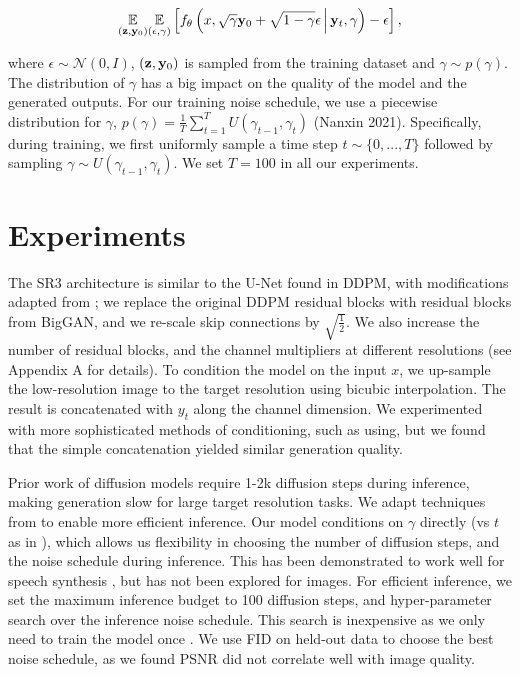 \documentclass{article}
\begin{document}
\begin{equation}
\underset{(\bold{z},\bold{y}_{0})}{\mathbb{E}}\underset{(\epsilon,\gamma)}{\mathbb{E}} \left[ f_{\theta}\left(x, \sqrt{\gamma} \bold{y}_0 + \sqrt{1 - \gamma} \epsilon \, \middle|\, \bold{y}_{t}, \gamma\right) - \epsilon \right],
\end{equation} 

where $\epsilon \sim \mathcal{N}(0, I)$, $(\bold{z},\bold{y}_{0})$ is sampled from the training dataset and $\gamma \sim p(\gamma)$. The distribution of $\gamma$ has a big impact on the quality of the model and the generated outputs. For our training noise schedule, we use a piecewise distribution for $\gamma$, $p(\gamma) = \frac{1}{T}\sum_{t=1}^{T} U(\gamma_{t-1}, \gamma_t)$ (Nanxin 2021). Specifically, during training, we first uniformly sample a time step $t \sim \{0, ..., T\}$ followed by sampling $\gamma \sim U(\gamma_{t-1}, \gamma_t)$. We set $T = 100$ in all our experiments.


\section{Experiments}

The SR3 architecture is similar to the U-Net found in DDPM, with modifications adapted from \cite{ref51}; we replace the original DDPM residual blocks with residual blocks from BigGAN, and we re-scale skip connections by $\sqrt{\frac{1}{2}}$. We also increase the number of residual blocks, and the channel multipliers at different resolutions (see Appendix A for details). To condition the model on the input $x$, we up-sample the low-resolution image to the target resolution using bicubic interpolation. The result is concatenated with $y_t$ along the channel dimension. We experimented with more sophisticated methods of conditioning, such as using, but we found that the simple concatenation yielded similar generation quality.


Prior work of diffusion models \cite{ref17, ref51} require 1-2k diffusion steps during inference, making generation slow for large target resolution tasks. We adapt techniques from \cite{ref6} to enable more efficient inference. Our model conditions on $\gamma$ directly (vs $t$ as in \cite{ref17}), which allows us flexibility in choosing the number of diffusion steps, and the noise schedule during inference. This has been demonstrated to work well for speech synthesis \cite{ref6}, but has not been explored for images. For efficient inference, we set the maximum inference budget to 100 diffusion steps, and hyper-parameter search over the inference noise schedule. This search is inexpensive as we only need to train the model once \cite{ref6}. We use FID on held-out data to choose the best noise schedule, as we found PSNR did not correlate well with image quality.
\end{document}
